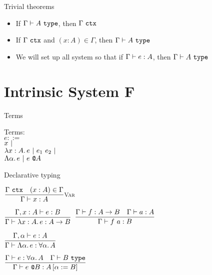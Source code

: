 \documentclass{beamer}
\begin{document}
\begin{frame}{Trivial theorems}

\begin{itemize}
  \item If $\type{A}$, then $\tyctx{\Gamma}$
  \item If $\tyctx{\Gamma}$ and $(x : A) \in \Gamma$, then $\type{A}$
  \item We will set up all system so that if $\typing{e}{A}$, then $\type{A}$
\end{itemize}

\end{frame}

\section{Intrinsic System F}

\begin{frame}{Terms}

Terms: \\
$e ::=$ \\
\qquad $x \pipe $ \\
\qquad $\ifun{x}{A}{e} \pipe \app{e_1}{e_2} \pipe$ \\
\qquad $\tfun{\alpha}{e} \pipe \tapp{e}{A}$

\end{frame}

\begin{frame}{Declarative typing}

\begin{center}
  $\infrule[Var]{\tyctx{\Gamma} \quad \sidecond{(x : A) \in \Gamma}}{\typing{x}{A}}$

  \vspace{2em}

  $\infrule{\fulltyping{\extend{\Gamma}{x}{A}}{e}{B}}{\typing{\ifun{x}{A}{e}}{\Fun{A}{B}}}$ \quad
  $\infrule{\typing{f}{\Fun{A}{B}} \quad \typing{a}{A}}{\typing{\app{f}{a}}{B}}$

  \vspace{2em}

  $\infrule{\fulltyping{\extendtype{\Gamma}{\alpha}}{e}{A}}{\typing{\tfun{\alpha}{e}}{\ForallT{\alpha}{A}}}$

  \vspace{2em}

  $\infrule{\typing{e}{\ForallT{\alpha}{A}} \quad \type{B}}{\typing{\tapp{e}{B}}{\subst{A}{\alpha}{B}}}$
\end{center}

\end{frame}
\end{document}
